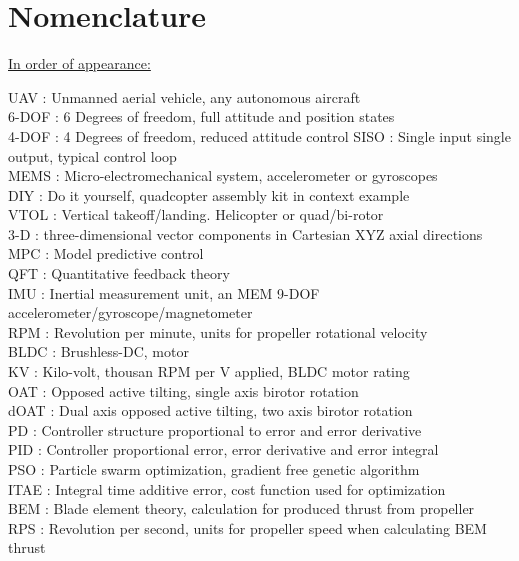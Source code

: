 \documentclass[a4paper, 11pt, oneside, openright, parskip=full]{book}
\begin{document}
\chapter{Nomenclature}
\label{ch:nom}
\underline{In order of appearance:}
\par
UAV : Unmanned aerial vehicle, any autonomous aircraft\\
6-DOF : 6 Degrees of freedom, full attitude and position states\\
4-DOF : 4 Degrees of freedom, reduced attitude control
SISO : Single input single output, typical control loop\\
MEMS : Micro-electromechanical system, accelerometer or gyroscopes\\
DIY : Do it yourself, quadcopter assembly kit in context example\\
VTOL : Vertical takeoff/landing. Helicopter or quad/bi-rotor\\
3-D : three-dimensional vector components in Cartesian XYZ axial directions\\
MPC : Model predictive control\\
QFT : Quantitative feedback theory\\
IMU : Inertial measurement unit, an MEM 9-DOF accelerometer/gyroscope/magnetometer\\
RPM : Revolution per minute, units for propeller rotational velocity\\
BLDC : Brushless-DC, motor\\
KV : Kilo-volt, thousan RPM per V applied, BLDC motor rating\\
OAT : Opposed active tilting, single axis birotor rotation\\
dOAT : Dual axis opposed active tilting, two axis birotor rotation\\
PD : Controller structure proportional to error and error derivative\\
PID : Controller proportional error, error derivative and error integral\\
PSO : Particle swarm optimization, gradient free genetic algorithm\\
ITAE : Integral time additive error, cost function used for optimization\\
BEM : Blade element theory, calculation for produced thrust from propeller\\
RPS : Revolution per second, units for propeller speed when calculating BEM thrust\\
\end{document}
